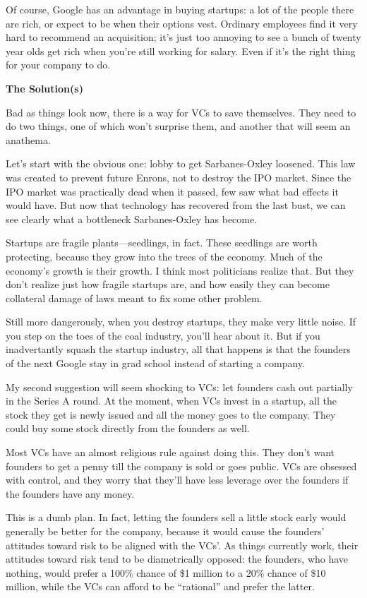 Of course, Google has an advantage in buying startups: a lot of the
people there are rich, or expect to be when their options vest. Ordinary
employees find it very hard to recommend an acquisition; it's just too
annoying to see a bunch of twenty year olds get rich when you're still
working for salary. Even if it's the right thing for your company to do.

\textbf{The Solution(s)}

Bad as things look now, there is a way for VCs to save themselves. They
need to do two things, one of which won't surprise them, and another
that will seem an anathema.

Let's start with the obvious one: lobby to get Sarbanes-Oxley loosened.
This law was created to prevent future Enrons, not to destroy the IPO
market. Since the IPO market was practically dead when it passed, few
saw what bad effects it would have. But now that technology has
recovered from the last bust, we can see clearly what a bottleneck
Sarbanes-Oxley has become.

Startups are fragile plants---seedlings, in fact. These seedlings are
worth protecting, because they grow into the trees of the economy. Much
of the economy's growth is their growth. I think most politicians
realize that. But they don't realize just how fragile startups are, and
how easily they can become collateral damage of laws meant to fix some
other problem.

Still more dangerously, when you destroy startups, they make very little
noise. If you step on the toes of the coal industry, you'll hear about
it. But if you inadvertantly squash the startup industry, all that
happens is that the founders of the next Google stay in grad school
instead of starting a company.

My second suggestion will seem shocking to VCs: let founders cash out
partially in the Series A round. At the moment, when VCs invest in a
startup, all the stock they get is newly issued and all the money goes
to the company. They could buy some stock directly from the founders as
well.

Most VCs have an almost religious rule against doing this. They don't
want founders to get a penny till the company is sold or goes public.
VCs are obsessed with control, and they worry that they'll have less
leverage over the founders if the founders have any money.

This is a dumb plan. In fact, letting the founders sell a little stock
early would generally be better for the company, because it would cause
the founders' attitudes toward risk to be aligned with the VCs'. As
things currently work, their attitudes toward risk tend to be
diametrically opposed: the founders, who have nothing, would prefer a
100\% chance of \$1 million to a 20\% chance of \$10 million, while the
VCs can afford to be ``rational'' and prefer the latter.

